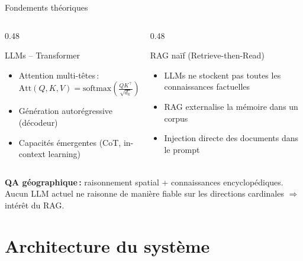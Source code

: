 \documentclass[aspectratio=169, 12pt]{beamer}
\begin{document}
\begin{frame}{Fondements th\'eoriques}
  \begin{columns}[T]
    \begin{column}{0.48\textwidth}
      \begin{block}{LLMs -- Transformer}
        \small
        \begin{itemize}
          \item Attention multi-t\^etes\,:\\
            $\text{Att}(Q,K,V) = \text{softmax}\!\left(\frac{QK^\top}{\sqrt{d_k}}\right)\!V$
          \item G\'en\'eration autor\'egressive (d\'ecodeur)
          \item Capacit\'es \'emergentes (CoT, in-context learning)
        \end{itemize}
      \end{block}
    \end{column}
    \begin{column}{0.48\textwidth}
      \begin{block}{RAG na\"if (Retrieve-then-Read)}
        \small
        \begin{itemize}
          \item LLMs ne stockent pas toutes les connaissances factuelles
          \item RAG externalise la m\'emoire dans un corpus
          \item Injection directe des documents dans le prompt
        \end{itemize}
      \end{block}
    \end{column}
  \end{columns}

  \vspace{0.1cm}
  \small
  \textbf{QA g\'eographique\,:} raisonnement spatial + connaissances encyclop\'ediques.
  Aucun LLM actuel ne raisonne de mani\`ere fiable sur les directions cardinales $\Rightarrow$ int\'er\^et du RAG.
\end{frame}

\section{Architecture du syst\`eme}
\end{document}
